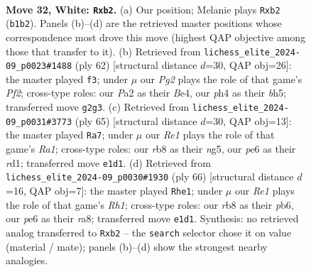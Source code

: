 \documentclass[11pt]{article}
\begin{document}
\clearpage

\begin{figure}[p]\centering
\begin{subfigure}{0.46\textwidth}\centering
\resizebox{\linewidth}{!}{%
\newchessgame
\chessboard[
  setfen={1r6/1p3pk1/p3p3/8/7p/4PP2/Pb4PP/1R2R1K1 w - - 0 32},
  showmover=false,
  pgfstyle=straightmove, color=movearrow, markmove={b1-b2}
]}
\caption{}
\end{subfigure}\hfill
\begin{subfigure}{0.46\textwidth}\centering
\resizebox{\linewidth}{!}{%
\newchessgame
\chessboard[
  setfen={1r3k2/8/p2P3p/Pp4pb/4B3/2p5/1b3P1P/1R2R1K1 w - - 0 32},
  showmover=false,
  pgfstyle=straightmove, color=movearrow, markmove={f2-f3}
]}
\caption{}
\end{subfigure}
\\[4pt]
\begin{subfigure}{0.46\textwidth}\centering
\resizebox{\linewidth}{!}{%
\newchessgame
\chessboard[
  setfen={r4rk1/8/5Bp1/p3P1Np/1p5P/8/5PP1/3R2K1 b - - 3 33},
  showmover=false,
  pgfstyle=straightmove, color=movearrow, markmove={a8-a7}
]}
\caption{}
\end{subfigure}\hfill
\begin{subfigure}{0.46\textwidth}\centering
\resizebox{\linewidth}{!}{%
\newchessgame
\chessboard[
  setfen={r6k/7p/1pp2p2/2b5/p7/5PP1/1P5P/1KR4R w - - 0 34},
  showmover=false,
  pgfstyle=straightmove, color=movearrow, markmove={h1-e1}
]}
\caption{}
\end{subfigure}
\caption{\textbf{Move 32, White: \texttt{Rxb2}.} (a) Our position; Melanie plays \texttt{Rxb2} (\texttt{b1b2}). Panels (b)--(d) are the retrieved master positions whose correspondence most drove this move (highest QAP objective among those that transfer to it). (b) Retrieved from \texttt{lichess\_elite\_2024-09\_p0023\#1488} (ply 62) [structural distance $d$=30, QAP obj=26]: the master played \texttt{f3}; under $\mu$ our \emph{Pg2} plays the role of that game's \emph{Pf2}; cross-type roles: our \emph{P}a2 as their \emph{B}e4, our \emph{p}h4 as their \emph{b}h5; transferred move \texttt{g2g3}. (c) Retrieved from \texttt{lichess\_elite\_2024-09\_p0031\#3773} (ply 65) [structural distance $d$=30, QAP obj=13]: the master played \texttt{Ra7}; under $\mu$ our \emph{Re1} plays the role of that game's \emph{Ra1}; cross-type roles: our \emph{r}b8 as their \emph{n}g5, our \emph{p}e6 as their \emph{r}d1; transferred move \texttt{e1d1}. (d) Retrieved from \texttt{lichess\_elite\_2024-09\_p0030\#1930} (ply 66) [structural distance $d$=16, QAP obj=7]: the master played \texttt{Rhe1}; under $\mu$ our \emph{Re1} plays the role of that game's \emph{Rh1}; cross-type roles: our \emph{r}b8 as their \emph{p}b6, our \emph{p}e6 as their \emph{r}a8; transferred move \texttt{e1d1}. Synthesis: no retrieved analog transferred to \texttt{Rxb2} -- the \texttt{search} selector chose it on value (material / mate); panels (b)--(d) show the strongest nearby analogies.}
\label{fig:thought-m62}
\end{figure}
\end{document}

